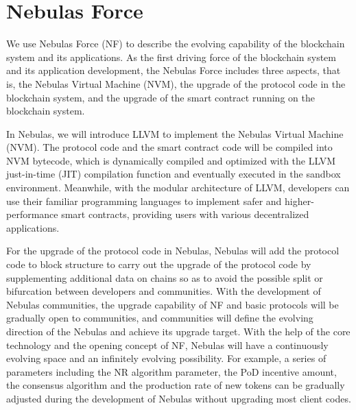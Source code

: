 \section{Nebulas Force}
\label{sec:nebulasforce}

We use Nebulas Force (NF) to describe the evolving capability of the blockchain system and its applications. As the first driving force of the blockchain system and its application development, the Nebulas Force includes three aspects, that is, the Nebulas Virtual Machine (NVM), the upgrade of the protocol code in the blockchain system, and the upgrade of the smart contract running on the blockchain system.


In Nebulas, we will introduce LLVM to implement the Nebulas Virtual Machine (NVM). The protocol code and the smart contract code will be compiled into NVM bytecode, which is dynamically compiled and optimized with the LLVM just-in-time (JIT) compilation function and eventually executed in the sandbox environment. Meanwhile, with the modular architecture of LLVM, developers can use their familiar programming languages to implement safer and higher-performance smart contracts, providing users with various decentralized applications.


For the upgrade of the protocol code in Nebulas, Nebulas will add the protocol code to block structure to carry out the upgrade of the protocol code by supplementing additional data on chains so as to avoid the possible split or bifurcation between developers and communities. With the development of Nebulas communities, the upgrade capability of NF and basic protocols will be gradually open to communities, and communities will define the evolving direction of the Nebulas and achieve its upgrade target. With the help of the core technology and the opening concept of NF, Nebulas will have a continuously evolving space and an infinitely evolving possibility. For example, a series of parameters including the NR algorithm parameter, the PoD incentive amount, the consensus algorithm and the production rate of new tokens can be gradually adjusted during the development of Nebulas without upgrading most client codes.

